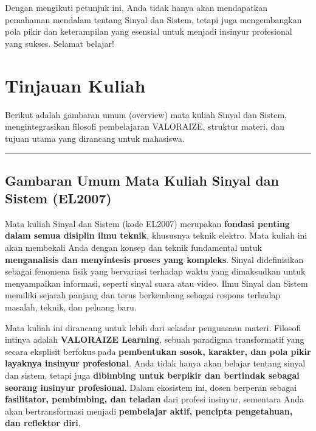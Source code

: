 \documentclass[
  letterpaper,
  DIV=11,
  numbers=noendperiod]{scrreprt}
\begin{document}
Dengan mengikuti petunjuk ini, Anda tidak hanya akan mendapatkan
pemahaman mendalam tentang Sinyal dan Sistem, tetapi juga mengembangkan
pola pikir dan keterampilan yang esensial untuk menjadi insinyur
profesional yang sukses. Selamat belajar!


\chapter{Tinjauan Kuliah}\label{tinjauan-kuliah}

Berikut adalah gambaran umum (overview) mata kuliah Sinyal dan Sistem,
mengintegrasikan filosofi pembelajaran VALORAIZE, struktur materi, dan
tujuan utama yang dirancang untuk mahasiswa.

\begin{center}\rule{0.5\linewidth}{0.5pt}\end{center}

\section{\texorpdfstring{\textbf{Gambaran Umum Mata Kuliah Sinyal dan
Sistem
(EL2007)}}{Gambaran Umum Mata Kuliah Sinyal dan Sistem (EL2007)}}\label{gambaran-umum-mata-kuliah-sinyal-dan-sistem-el2007}

Mata kuliah Sinyal dan Sistem (kode EL2007) merupakan \textbf{fondasi
penting dalam semua disiplin ilmu teknik}, khususnya teknik elektro.
Mata kuliah ini akan membekali Anda dengan konsep dan teknik fundamental
untuk \textbf{menganalisis dan menyintesis proses yang kompleks}. Sinyal
didefinisikan sebagai fenomena fisik yang bervariasi terhadap waktu yang
dimaksudkan untuk menyampaikan informasi, seperti sinyal suara atau
video. Ilmu Sinyal dan Sistem memiliki sejarah panjang dan terus
berkembang sebagai respons terhadap masalah, teknik, dan peluang baru.

Mata kuliah ini dirancang untuk lebih dari sekadar penguasaan materi.
Filosofi intinya adalah \textbf{VALORAIZE Learning}, sebuah paradigma
transformatif yang secara eksplisit berfokus pada \textbf{pembentukan
sosok, karakter, dan pola pikir layaknya insinyur profesional}. Anda
tidak hanya akan belajar tentang sinyal dan sistem, tetapi juga
\textbf{dibimbing untuk berpikir dan bertindak sebagai seorang insinyur
profesional}. Dalam ekosistem ini, dosen berperan sebagai
\textbf{fasilitator, pembimbing, dan teladan} dari profesi insinyur,
sementara Anda akan bertransformasi menjadi \textbf{pembelajar aktif,
pencipta pengetahuan, dan reflektor diri}.
\end{document}
